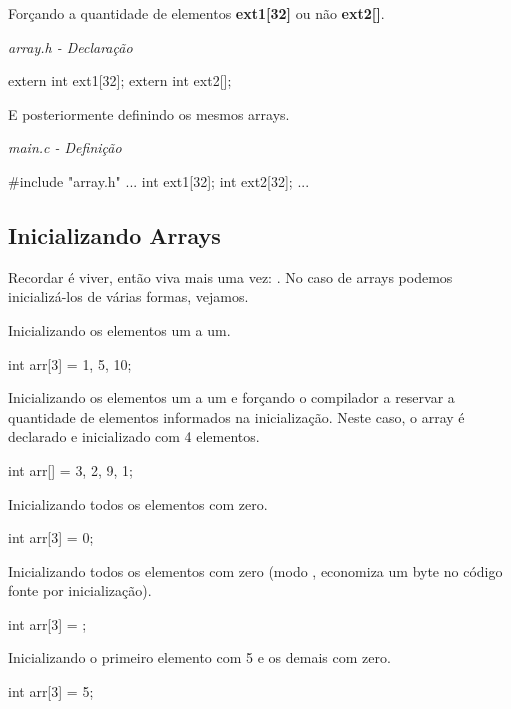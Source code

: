 Forçando a quantidade de elementos \textbf{ext1[32]} ou não \textbf{ext2[]}.

\textit{array.h - Declaração}\\
\begin{ccode}
  extern int ext1[32];
  extern int ext2[];
\end{ccode}

E posteriormente definindo os mesmos arrays.

\textit{main.c - Definição}\\
\begin{ccode}
  #include "array.h"
  ...
  int ext1[32];
  int ext2[32];
  ...
\end{ccode}

\subsection{Inicializando Arrays}
Recordar é viver, então viva mais uma vez: . No caso de arrays podemos inicializá-los de várias
formas, vejamos.

Inicializando os elementos um a um.

\begin{ccode}
  int arr[3] = {1, 5, 10};
\end{ccode}

Inicializando os elementos um a um e forçando o compilador a reservar a
quantidade de elementos informados na inicialização. Neste caso, o array é
declarado e inicializado com 4 elementos.

\begin{ccode}
  int arr[] = {3, 2, 9, 1};
\end{ccode}

Inicializando todos os elementos com zero.

\begin{ccode}
  int arr[3] = {0};
\end{ccode}

Inicializando todos os elementos com zero (modo ,
economiza um byte no código fonte por inicialização).

\begin{ccode}
  int arr[3] = {};
\end{ccode}

Inicializando o primeiro elemento com 5 e os demais com zero.

\begin{ccode}
  int arr[3] = {5};
\end{ccode}

